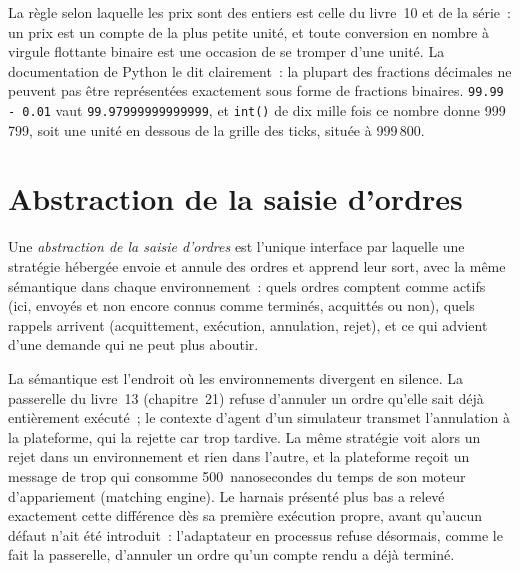 La règle selon laquelle les prix sont des entiers est celle du livre~10 et de la série~: un prix est un compte de la plus petite unité, et toute conversion en
nombre à virgule flottante binaire est une occasion de se tromper d'une unité. La documentation de Python le dit clairement~: la plupart des fractions décimales ne peuvent pas être représentées
exactement sous forme de fractions binaires. \texttt{99.99 - 0.01} vaut \texttt{99.97999999999999}, et \texttt{int()} de dix mille fois ce nombre donne
999\,799, soit une unité en dessous de la grille des ticks, située à 999\,800.

\section{Abstraction de la saisie d'ordres}

\begin{definition}\label{def:pl:simulation-production-parity:oe}
Une \emph{abstraction de la saisie d'ordres} est l'unique interface par laquelle une stratégie hébergée envoie et annule
des ordres et apprend leur sort, avec la même sémantique dans chaque environnement~: quels ordres comptent comme actifs (ici, envoyés et non encore
connus comme terminés, acquittés ou non), quels rappels arrivent (acquittement, exécution, annulation, rejet), et ce qui advient d'une demande qui
ne peut plus aboutir.
\end{definition}

La sémantique est l'endroit où les environnements divergent en silence. La passerelle du livre~13 (chapitre~21) refuse d'annuler un ordre qu'elle sait déjà entièrement exécuté~;
le contexte d'agent d'un simulateur transmet l'annulation à la plateforme, qui la rejette car trop tardive. La même stratégie voit alors un rejet dans un
environnement et rien dans l'autre, et la plateforme reçoit un message de trop qui consomme 500~nanosecondes du temps de son moteur d'appariement (matching engine). Le
harnais présenté plus bas a relevé exactement cette différence dès sa première exécution propre, avant qu'aucun défaut n'ait été introduit~: l'adaptateur en processus refuse désormais, comme le fait la passerelle, d'annuler
un ordre qu'un compte rendu a déjà terminé.

\label{lst:pl:simulation-production-parity:host}

